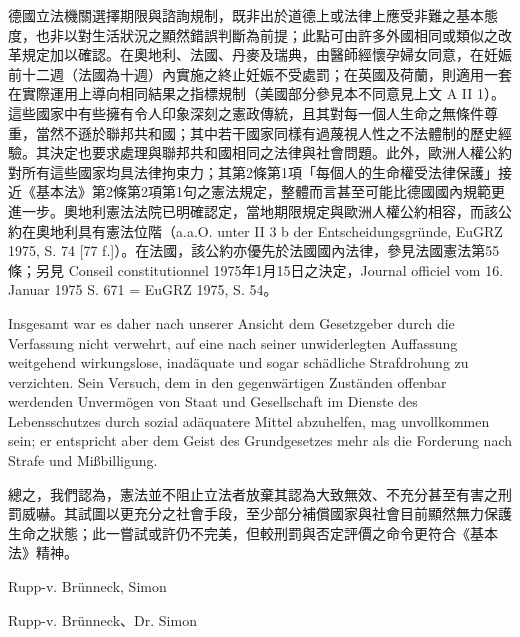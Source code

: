 \documentclass[12pt]{article}
\begin{document}
\begin{transpara}
德國立法機關選擇期限與諮詢規制，既非出於道德上或法律上應受非難之基本態度，也非以對生活狀況之顯然錯誤判斷為前提；此點可由許多外國相同或類似之改革規定加以確認。在奧地利、法國、丹麥及瑞典，由醫師經懷孕婦女同意，在妊娠前十二週（法國為十週）內實施之終止妊娠不受處罰；在英國及荷蘭，則適用一套在實際運用上導向相同結果之指標規制（美國部分參見本不同意見上文 A II 1）。這些國家中有些擁有令人印象深刻之憲政傳統，且其對每一個人生命之無條件尊重，當然不遜於聯邦共和國；其中若干國家同樣有過蔑視人性之不法體制的歷史經驗。其決定也要求處理與聯邦共和國相同之法律與社會問題。此外，歐洲人權公約對所有這些國家均具法律拘束力；其第2條第1項「每個人的生命權受法律保護」接近《基本法》第2條第2項第1句之憲法規定，整體而言甚至可能比德國國內規範更進一步。奧地利憲法法院已明確認定，當地期限規定與歐洲人權公約相容，而該公約在奧地利具有憲法位階（a.a.O. unter II 3 b der Entscheidungsgründe, EuGRZ 1975, S. 74 [77 f.]）。在法國，該公約亦優先於法國國內法律，參見法國憲法第55條；另見 Conseil constitutionnel 1975年1月15日之決定，Journal officiel vom 16. Januar 1975 S. 671 = EuGRZ 1975, S. 54。
\end{transpara}

\syncleft
\begin{sourcepara}
Insgesamt war es daher nach unserer Ansicht dem Gesetzgeber durch die Verfassung nicht verwehrt, auf eine nach seiner unwiderlegten Auffassung weitgehend wirkungslose, inadäquate und sogar schädliche Strafdrohung zu verzichten. Sein Versuch, dem in den gegenwärtigen Zuständen offenbar werdenden Unvermögen von Staat und Gesellschaft im Dienste des Lebensschutzes durch sozial adäquatere Mittel abzuhelfen, mag unvollkommen sein; er entspricht aber dem Geist des Grundgesetzes mehr als die Forderung nach Strafe und Mißbilligung.
\end{sourcepara}
\begin{transpara}
總之，我們認為，憲法並不阻止立法者放棄其認為大致無效、不充分甚至有害之刑罰威嚇。其試圖以更充分之社會手段，至少部分補償國家與社會目前顯然無力保護生命之狀態；此一嘗試或許仍不完美，但較刑罰與否定評價之命令更符合《基本法》精神。
\end{transpara}

\syncleft
\begin{sourcepara}
{\centering Rupp-v. Brünneck, \abbrDr{} Simon\par}
\end{sourcepara}
\begin{transpara}
{\centering Rupp-v. Brünneck、Dr. Simon\par}
\end{transpara}
\end{document}
